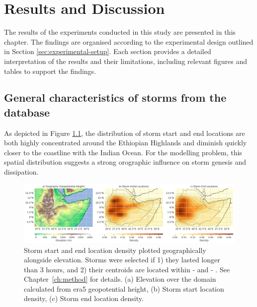 \chapter{Results and Discussion}
\label{ch:results}

The results of the experiments conducted in this study are presented in this chapter. The findings are organised according to the experimental design outlined in Section \ref{sec:experimental-setup}. Each section provides a detailed interpretation of the results and their limitations, including relevant figures and tables to support the findings.

\section{General characteristics of storms from the database}

As depicted in Figure \ref{fig:orography_storm_init_end_kde}, the distribution of storm start and end locations are both highly concentrated around the Ethiopian Highlands and diminish quickly closer to the coastline with the Indian Ocean. For the modelling problem, this spatial distribution suggests a strong orographic influence on storm genesis and dissipation.

\begin{figure}[ht]
    \centering
    \includegraphics[width=\textwidth]{../figures/generated/exploration/orography_storm_init_end_kde.png}
    \caption{Storm start and end location density plotted geographically alongside elevation. Storms were selected if 1) they lasted longer than 3 hours, and 2) their centroids are located within  -  and  -  \citep{Hill2023}. See Chapter~\ref{ch:method} for details. (a) Elevation over the domain calculated from \acrshort{era5} geopotential height, (b) Storm start location density, (c) Storm end location density.}
    \label{fig:orography_storm_init_end_kde}
\end{figure}

